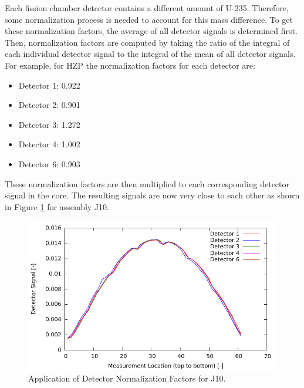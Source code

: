Each fission chamber detector contains a different amount of U-235. Therefore, some normalization 
process is needed to account for this mass difference. To get these normalization factors,
the average of all detector signals is determined first. Then, normalization factors
are computed by taking the ratio of the integral of each individual detector signal
to the integral of the mean of all detector signals. For example, for \ac{HZP} the 
normalization factors for each detector are:
\begin{itemize}
  \item{Detector 1: 0.922}
  \item{Detector 2: 0.901}
  \item{Detector 3: 1.272}
  \item{Detector 4: 1.002}
  \item{Detector 6: 0.903}
\end{itemize}
These normalization factors are then multiplied to each corresponding detector signal 
in the core. The resulting signals are now very close to each other as shown in
Figure \ref{fig:detnorm} for assembly J10.
\begin{figure}[htbp]
    \centering
    \includegraphics{expdata/figs/norm_factors.pdf}
    \caption{Application of Detector Normalization Factors for J10. \label{fig:detnorm}}
\end{figure}

